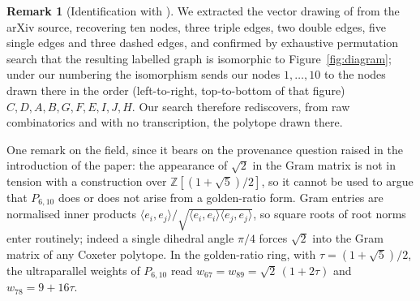 \documentclass[11pt,reqno]{amsart}
\theoremstyle{plain}
\theoremstyle{definition}
\newtheorem{remark}[theorem]{Remark}
\newcommand{\ZZ}{\mathbb{Z}}
\newcommand{\PP}{P_{6,10}}
\begin{document}
\begin{remark}[Identification with {\cite[Fig.~5]{Burcroff2024}}]
\label{rem:burcroff-fig5}
We extracted the vector drawing of \cite[Fig.~5]{Burcroff2024} from the arXiv
source, recovering ten nodes, three triple edges, two double edges, five single
edges and three dashed edges, and confirmed by exhaustive permutation search
that the resulting labelled graph is isomorphic to Figure~\ref{fig:diagram};
under our numbering the isomorphism sends our nodes $1,\dots,10$ to the nodes
drawn there in the order (left-to-right, top-to-bottom of that figure) $C, D, A,
B, G, F, E, I, J, H$. Our search therefore rediscovers, from raw combinatorics
and with no transcription, the polytope drawn there.

One remark on the field, since it bears on the provenance question raised in
the introduction of the paper: the appearance of $\sqrt2$ in the Gram matrix is not in
tension with a construction over $\ZZ[(1+\sqrt5)/2]$, so it cannot be used to
argue that $\PP$ does or does not arise from a golden-ratio form. Gram entries
are normalised inner products $\langle e_i,e_j\rangle/
\sqrt{\langle e_i,e_i\rangle\langle e_j,e_j\rangle}$, so square roots of root
norms enter routinely; indeed a single dihedral angle $\pi/4$ forces $\sqrt2$
into the Gram matrix of any Coxeter polytope. In the golden-ratio ring, with
$\tau=(1+\sqrt5)/2$, the ultraparallel weights of $\PP$ read
$w_{67}=w_{89}=\sqrt2\,(1+2\tau)$ and $w_{78}=9+16\tau$.
\end{remark}




\end{document}
